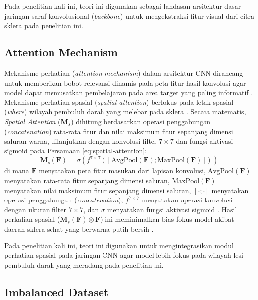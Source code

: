 Pada penelitian kali ini, teori ini digunakan sebagai landasan arsitektur dasar jaringan saraf konvolusional (\textit{backbone}) untuk mengekstraksi fitur visual dari citra sklera pada penelitian ini.

\subsection{Attention Mechanism}
\label{subsec:attention-mechanism}

Mekanisme perhatian (\textit{attention mechanism}) dalam arsitektur CNN dirancang untuk memberikan bobot relevansi dinamis pada peta fitur hasil konvolusi agar model dapat memusatkan pembelajaran pada area target yang paling informatif \parencite{jiang2023automatic, sangeethaa2024enhanced}. Mekanisme perhatian spasial (\textit{spatial attention}) berfokus pada letak spasial (\textit{where}) wilayah pembuluh darah yang melebar pada sklera \parencite{jiang2023automatic}. Secara matematis, \textit{Spatial Attention} ($\mathbf{M}_s$) dihitung berdasarkan operasi penggabungan (\textit{concatenation}) rata-rata fitur dan nilai maksimum fitur sepanjang dimensi saluran warna, dilanjutkan dengan konvolusi filter $7 \times 7$ dan fungsi aktivasi sigmoid pada Persamaan \ref{eq:spatial-attention}:
\begin{equation}
  \label{eq:spatial-attention}
  \mathbf{M}_s(\mathbf{F}) = \sigma\left(f^{7 \times 7}\left(\left[\text{AvgPool}(\mathbf{F}); \text{MaxPool}(\mathbf{F})\right]\right)\right)
\end{equation}
di mana $\mathbf{F}$ menyatakan peta fitur masukan dari lapisan konvolusi, $\text{AvgPool}(\mathbf{F})$ menyatakan rata-rata fitur sepanjang dimensi saluran, $\text{MaxPool}(\mathbf{F})$ menyatakan nilai maksimum fitur sepanjang dimensi saluran, $[\cdot ; \cdot]$ menyatakan operasi penggabungan (\textit{concatenation}), $f^{7 \times 7}$ menyatakan operasi konvolusi dengan ukuran filter $7 \times 7$, dan $\sigma$ menyatakan fungsi aktivasi sigmoid \parencite{sangeethaa2024enhanced, jiang2023automatic}. Hasil perkalian spasial ($\mathbf{M}_s(\mathbf{F}) \otimes \mathbf{F}$) ini meminimalkan bias fokus model akibat daerah sklera sehat yang berwarna putih bersih \parencite{sangeethaa2024enhanced}.

Pada penelitian kali ini, teori ini digunakan untuk mengintegrasikan modul perhatian spasial pada jaringan CNN agar model lebih fokus pada wilayah lesi pembuluh darah yang meradang pada penelitian ini.

\subsection{Imbalanced Dataset}
\label{subsec:imbalanced-dataset}

